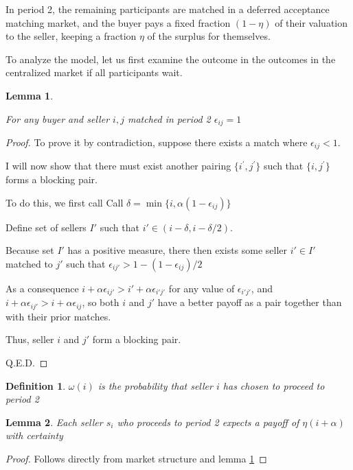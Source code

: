 \documentclass[WP]{AEA}
\newtheorem{lemma}{Lemma}
\newtheorem{deff}{Definition}
\begin{document}
In period 2, the remaining participants are matched in a deferred acceptance matching market, and the buyer pays a fixed fraction $(1-\eta)$ of their valuation to the seller, keeping a fraction $\eta$ of the surplus for themselves.

To analyze the model, let us first examine the outcome in the outcomes in the centralized market if all participants wait. 


\begin{lemma} \label{lemma:e_1}

For any buyer and seller ${i, j}$ matched in period 2  $\epsilon_{ij} = 1$
\end{lemma}
\begin{proof}
	To prove it by contradiction, suppose there exists a match where $\epsilon_{ij} < 1$.

	I will now show that there must exist another pairing $ \{i^{'}, j^{'} \} $ such that 	$\{i,j^{'} \}$ forms a blocking pair. 

	To do this, we first call	
	Call $\delta = \min{\{i, \alpha(1-  \epsilon_{ij})\}}$
	
	Define set of sellers $I'$ such that $i' \in (i-\delta, i-\delta / 2)$.
	
	Because set $I'$ has a positive measure, there then exists some seller $i' \in I'$ matched to $j'$ such that $  \epsilon_{ij'} > 1-(1- \epsilon_{ij}) / 2$
	
	As a consequence $i+ \alpha \epsilon_{ij'} > i' + \alpha \epsilon_{i'j'}$ for any value of $\epsilon_{i'j'}$, and $i+ \alpha \epsilon_{ij'} > i + \alpha \epsilon_{ij}$, so both $i$ and $j'$ have a better payoff as a pair together than with their prior matches.
	
	Thus, seller $i$ and $j'$ form a blocking pair.
	
	Q.E.D.
\end{proof}

\begin{deff}
	$\omega(i) $ is the probability that seller $i$ has chosen to proceed to period 2

\end{deff}

\begin{lemma}

	Each seller $s_i$ who proceeds to period 2 expects a payoff of $\eta (i+\alpha)$ with certainty

\end{lemma}

\begin{proof}
	Follows directly from market structure and lemma \ref{lemma:e_1}
\end{proof}
\end{document}
